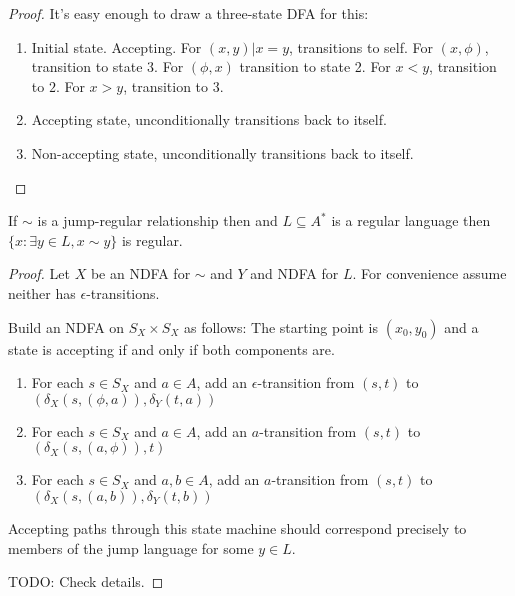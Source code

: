 \begin{proof}
It's easy enough to draw a three-state DFA for this:

\begin{enumerate}
\item Initial state. Accepting. For \((x, y) | x = y\), transitions to self.
For \((x, \phi)\), transition to state \(3\). For \((\phi, x)\) transition to state 2.
For \(x < y\), transition to \(2\). For \(x > y\), transition to 3.
\item Accepting state, unconditionally transitions back to itself.
\item Non-accepting state, unconditionally transitions back to itself.
\end{enumerate}
\end{proof}


\begin{theorem}
If \(\sim\) is a jump-regular relationship then and \(L \subseteq A^*\) is a regular language then \(\{x: \exists y \in L, x \sim y\}\) is regular.
\end{theorem}

\begin{proof}
Let \(X\) be an NDFA for \(\sim\) and \(Y\) and NDFA for \(L\).
For convenience assume neither has \(\epsilon\)-transitions.

Build an NDFA on \(S_X \times S_X\) as follows:
The starting point is \((x_0, y_0)\) and a state is accepting if and only if both components are.

\begin{enumerate}
\item For each \(s \in S_X\) and \(a \in A\), add an \(\epsilon\)-transition from \((s, t)\) to \((\delta_X(s, (\phi, a)), \delta_Y(t, a))\)
\item For each \(s \in S_X\) and \(a \in A\), add an \(a\)-transition from \((s, t)\) to \((\delta_X(s, (a, \phi)), t)\)
\item For each \(s \in S_X\) and \(a, b \in A\), add an \(a\)-transition from \((s, t)\) to \((\delta_X(s, (a, b)), \delta_Y(t, b))\)
\end{enumerate}

Accepting paths through this state machine should correspond precisely to members of the jump language for some \(y \in L\).

TODO: Check details.
\end{proof}

